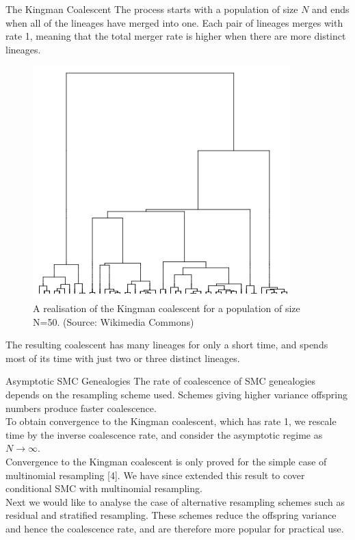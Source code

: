\documentclass[final, 12pt]{beamer}
\newlength{\colwidth}
\begin{document}
\begin{frame}
\begin{columns}
\begin{column}{\colwidth}
\begin{block}{The Kingman Coalescent}
The process starts with a population of size $N$ and ends when all of the lineages have merged into one.
Each pair of lineages merges with rate 1, meaning that the total merger rate is higher when there are more distinct lineages. 
\begin{figure}
\includegraphics[width=0.8\colwidth]{kingman.png}
\caption{A realisation of the Kingman coalescent for a population of size N=50. \textmd{(Source: Wikimedia Commons)}}
\end{figure}
The resulting coalescent has many lineages for only a short time, and spends most of its time with just two or three distinct lineages.
\end{block}

\vspace*{15pt}

\begin{block}{Asymptotic SMC Genealogies}
The rate of coalescence of SMC genealogies depends on the resampling scheme used. 
Schemes giving higher variance offspring numbers produce faster coalescence.\\[10pt]

To obtain convergence to the Kingman coalescent, which has rate 1, we rescale time by the inverse coalescence rate, and consider the asymptotic regime as  $N\to\infty$.\\[10pt]

Convergence to the Kingman coalescent is only proved for the simple case of multinomial resampling [4]. We have since extended this result to cover conditional SMC with multinomial resampling.\\[10pt]

Next we would like to analyse the case of alternative resampling schemes such as residual and stratified resampling. These schemes reduce the offspring variance and hence the coalescence rate, and are therefore more popular for practical use.
\end{block}


\end{column}
\end{columns}
\end{frame}
\end{document}

